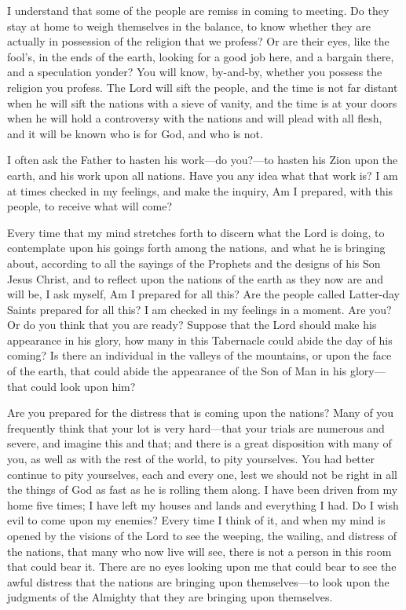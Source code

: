 					I understand that some of the people are remiss in coming to meeting. Do they stay at home to weigh themselves in the balance, to know whether they are actually in possession of the religion that we profess? Or are their eyes, like the fool's, in the ends of the earth, looking for a good job here, and a bargain there, and a speculation yonder? You will know, by-and-by, whether you possess the religion you profess. The Lord will sift the people, and the time is not far distant when he will sift the nations with a sieve of vanity, and the time is at your doors when he will hold a controversy with the nations and will plead with all flesh, and it will be known who is for God, and who is not.

					I often ask the Father to hasten his work---do you?---to hasten his Zion upon the earth, and his work upon all nations. Have you any idea what that work is? I am at times checked in my feelings, and make the inquiry, Am I prepared, with this people, to receive what will come?

					Every time that my mind stretches forth to discern what the Lord is doing, to contemplate upon his goings forth among the nations, and what he is bringing about, according to all the sayings of the Prophets and the designs of his Son Jesus Christ, and to reflect upon the nations of the earth as they now are and will be, I ask myself, Am I prepared for all this? Are the people called Latter-day Saints prepared for all this? I am checked in my feelings in a moment. Are you? Or do you think that you are ready? Suppose that the Lord should make his appearance in his glory, how many in this Tabernacle could abide the day of his coming? Is there an individual in the valleys of the mountains, or upon the face of the earth, that could abide the appearance of the Son of Man in his glory---that could look upon him?

					Are you prepared for the distress that is coming upon the nations? Many of you frequently think that your lot is very hard---that your trials are numerous and severe, and imagine this and that; and there is a great disposition with many of you, as well as with the rest of the world, to pity yourselves. You had better continue to pity yourselves, each and every one, lest we should not be right in all the things of God as fast as he is rolling them along. I have been driven from my home five times; I have left my houses and lands and everything I had. Do I wish evil to come upon my enemies? Every time I think of it, and when my mind is opened by the visions of the Lord to see the weeping, the wailing, and distress of the nations, that many who now live will see, there is not a person in this room that could bear it. There are no eyes looking upon me that could bear to see the awful distress that the nations are bringing upon themselves---to look upon the judgments of the Almighty that they are bringing upon themselves.

